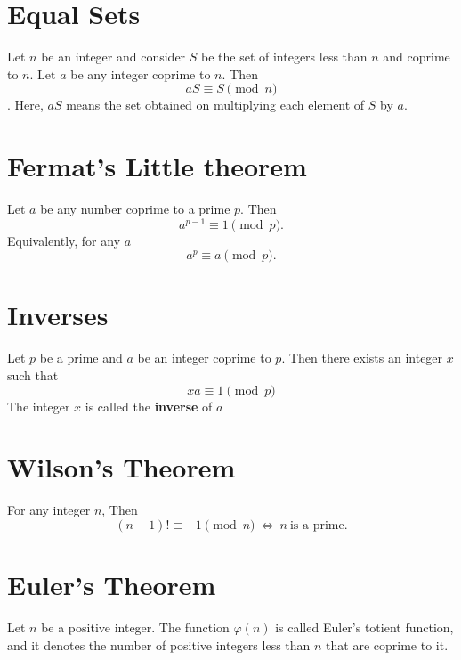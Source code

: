 \section{Equal Sets}

\begin{theorem}
    Let $n$ be an integer and consider $S$ be the set of integers less than $n$ and coprime to $n$. Let $a$ be any integer coprime to $n$. Then
\[aS \equiv S \pmod n\].
Here, $aS$ means the set obtained on multiplying each element of $S$ by $a$.
\end{theorem}

\section{Fermat's Little theorem}

\begin{theorem}
    Let $a$ be any number coprime to a prime $p$. Then
    \[a^{p-1} \equiv 1 \pmod p. \]
    Equivalently, for any $a$
    \[a^p \equiv a \pmod p. \]
\end{theorem}

\section{Inverses}

\begin{theorem}[Inverses]
    Let $p$ be a prime and $a$ be an integer coprime to $p$. Then there exists an integer $x$ such that
    \[xa \equiv 1 \pmod p\]
    The integer $x$ is called the \textbf{inverse} of $a$ 
\end{theorem}

\section{Wilson's Theorem}

\begin{theorem}
    For any integer $n$, Then
        \[(n-1)! \equiv -1 \pmod n \ \iff \ n \ \text{is a prime.}\]
\end{theorem}

\section{Euler's Theorem}

\begin{definition}
    Let $n$ be a positive integer. The function $\varphi(n)$ is called Euler's totient function, and it denotes the number of positive integers less than $n$ that are coprime to it.
\end{definition}

